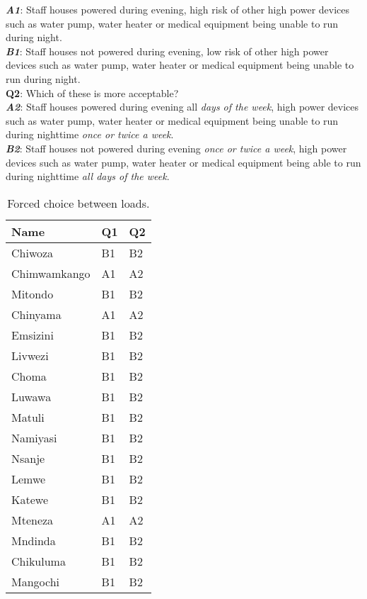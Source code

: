 \textbf{\textit{A1}}: Staff houses powered during evening, high risk of other high power devices such as water pump, water heater or medical equipment being unable to run during night.\\

\textbf{\textit{B1}}: Staff houses not powered during evening, low risk of other high power devices such as water pump, water heater or medical equipment being unable to run during night.\\

\noindent\textbf{Q2}: Which of these is more acceptable?\\

\textbf{\textit{A2}}: Staff houses powered during evening all \textit{days of the week},  high power devices such as water pump, water heater or medical equipment being unable to run during nighttime \textit{once or twice a week}.\\

\textbf{\textit{B2}}: Staff houses not powered during evening \textit{once or twice a week},  high power devices such as water pump, water heater or medical equipment being able to run during nighttime \textit{all days of the week}.


\begin{table}[ht!]
\centering
    \begin{tabular}{ m{4cm} m{2.5cm} m{2.5cm}} 
    \toprule
    \toprule
    \textbf{Name} & \textbf{Q1} & \textbf{Q2}\\
    \midrule
    Chiwoza         & B1 & B2  \\
    Chimwamkango    & A1 & A2  \\
    Mitondo         & B1 & B2  \\
    Chinyama        & A1 & A2  \\
    Emsizini        & B1 & B2  \\
    Livwezi         & B1 & B2  \\
    Choma           & B1 & B2  \\
    Luwawa          & B1 & B2  \\
    Matuli          & B1 & B2  \\
    Namiyasi        & B1 & B2  \\
    Nsanje          & B1 & B2  \\
    Lemwe           & B1 & B2  \\
    Katewe          & B1 & B2  \\
    Mteneza         & A1 & A2  \\
    Mndinda         & B1 & B2  \\
    Chikuluma       & B1 & B2  \\
    Mangochi        & B1 & B2  \\
    
    \bottomrule
    \bottomrule
    \end{tabular}
\caption[User survey- Forced choice]{Forced choice between loads.}
\label{tab:forced_choice}
\end{table}

